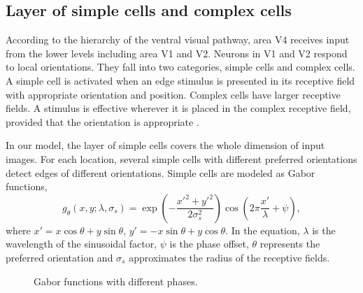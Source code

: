 \documentclass[10pt]{article}
\begin{document}
\subsection{Layer of simple cells and complex cells}

According to the hierarchy of the ventral visual pathway, area V4 receives input from the lower levels including area V1 and V2.
Neurons in V1 and V2 respond to local orientations.
They fall into two categories, simple cells and complex cells.
A simple cell is activated when an edge stimulus is presented in its receptive field with appropriate orientation and position.
Complex cells have larger receptive fields.
A stimulus is effective wherever it is placed in the complex receptive field, provided that the orientation is appropriate \cite{hubel1962}.

In our model, the layer of simple cells covers the whole dimension of input images.
For each location, several simple cells with different preferred orientations detect edges of different orientations.
Simple cells are modeled as Gabor functions,
\begin{equation}\label{equ:gabor}
g_{\theta}(x,y;\lambda,\sigma_s)
=\exp \left(-\frac{x'^2+y'^2}{2\sigma_s^2}\right)
\cos \left(2\pi\frac{x'}{\lambda}+\psi\right),
\end{equation}
where $x'=x\cos\theta+y\sin\theta$, $y'=-x\sin\theta+y\cos\theta$.
In the equation, $\lambda$ is the wavelength of the sinusoidal factor, 
$\psi$ is the phase offset, 
$\theta$ represents the preferred orientation and 
$\sigma_s$ approximates the radius of the receptive fields.

\begin{figure}
\centering
{}
\caption{Gabor functions with different phases.}
\label{fig:4}
\end{figure}
\end{document}
